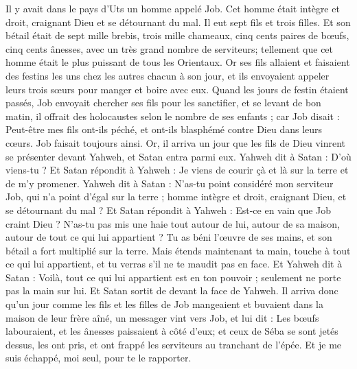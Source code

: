 \begin{multicols}{2}
\VerseOne{}Il y avait dans le pays d'Uts un homme appelé Job. Cet homme était intègre et droit, craignant Dieu et se détournant du mal.
Il eut sept fils et trois filles.
Et son bétail était de sept mille brebis, trois mille chameaux, cinq cents paires de bœufs, cinq cents ânesses, avec un très grand nombre de serviteurs; tellement que cet homme était le plus puissant de tous les Orientaux.
Or ses fils allaient et faisaient des festins les uns chez les autres chacun à son jour, et ils envoyaient appeler leurs trois sœurs pour manger et boire avec eux.
Quand les jours de festin étaient passés, Job envoyait chercher ses fils pour les sanctifier, et se levant de bon matin, il offrait des holocaustes selon le nombre de ses enfants ; car Job disait : Peut-être mes fils ont-ils péché, et ont-ils blasphémé contre Dieu dans leurs cœurs. Job faisait toujours ainsi.
Or, il arriva un jour que les fils de Dieu vinrent se présenter devant Yahweh, et Satan entra parmi eux.
Yahweh dit à Satan : D'où viens-tu ? Et Satan répondit à Yahweh : Je viens de courir çà et là sur la terre et de m'y promener.
Yahweh dit à Satan : N'as-tu point considéré mon serviteur Job, qui n'a point d'égal sur la terre ; homme intègre et droit, craignant Dieu, et se détournant du mal ?
Et Satan répondit à Yahweh : Est-ce en vain que Job craint Dieu ?
N'as-tu pas mis une haie  tout autour de lui, autour de sa maison, autour de tout ce qui lui appartient ? Tu as béni l'œuvre de ses mains, et son bétail a fort multiplié sur la terre.
Mais étends maintenant ta main, touche à tout ce qui lui appartient, et tu verras s'il ne te maudit pas en face.
Et Yahweh dit à Satan : Voilà, tout ce qui lui appartient est en ton pouvoir ; seulement ne porte pas la main sur lui. Et Satan sortit de devant la face de Yahweh.
Il arriva donc qu'un jour comme les fils et les filles de Job mangeaient et buvaient dans la maison de leur frère aîné, un messager vint vers Job,
et lui dit : Les bœufs labouraient, et les ânesses paissaient à côté d'eux;
et ceux de Séba se sont jetés dessus, les ont pris, et ont frappé les serviteurs au tranchant de l'épée. Et je me suis échappé, moi seul, pour te le rapporter.

\end{multicols}
